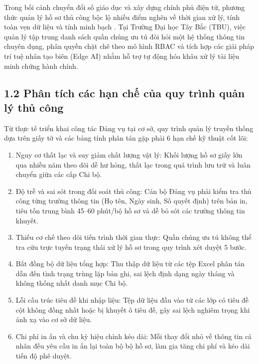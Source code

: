 \documentclass[12pt,a4paper]{report}
\begin{document}
Trong bối cảnh chuyển đổi số giáo dục và xây dựng chính phủ điện tử, phương thức quản lý hồ sơ thủ công bộc lộ nhiều điểm nghẽn về thời gian xử lý, tính toàn vẹn dữ liệu và tính minh bạch \cite{nusa2020iop, nofrianda2022jictas}. Tại Trường Đại học Tây Bắc (TBU), việc quản lý tập trung danh sách quần chúng ưu tú đòi hỏi một hệ thống thông tin chuyên dụng, phân quyền chặt chẽ theo mô hình RBAC và tích hợp các giải pháp trí tuệ nhân tạo biên (Edge AI) nhằm hỗ trợ tự động hóa khâu xử lý tài liệu minh chứng hành chính.

\subsection*{1.2 Phân tích các hạn chế của quy trình quản lý thủ công}
Từ thực tế triển khai công tác Đảng vụ tại cơ sở, quy trình quản lý truyền thống dựa trên giấy tờ và các bảng tính phân tán gặp phải 6 hạn chế kỹ thuật cốt lõi:
\begin{enumerate}[label=\arabic*.]
  \item Nguy cơ thất lạc và suy giảm chất lượng vật lý: Khối lượng hồ sơ giấy lớn qua nhiều năm theo dõi dễ hư hỏng, thất lạc trong quá trình lưu trữ và luân chuyển giữa các cấp Chi bộ.
  \item Độ trễ và sai sót trong đối soát thủ công: Cán bộ Đảng vụ phải kiểm tra thủ công từng trường thông tin (Họ tên, Ngày sinh, Số quyết định) trên bản in, tiêu tốn trung bình 45--60 phút/bộ hồ sơ và dễ bỏ sót các trường thông tin khuyết.
  \item Thiếu cơ chế theo dõi tiến trình thời gian thực: Quần chúng ưu tú không thể tra cứu trực tuyến trạng thái xử lý hồ sơ trong quy trình xét duyệt 5 bước.
  \item Bất đồng bộ dữ liệu tổng hợp: Thu thập dữ liệu từ các tệp Excel phân tán dẫn đến tình trạng trùng lặp bản ghi, sai lệch định dạng ngày tháng và không thống nhất danh mục Chi bộ.
  \item Lỗi cấu trúc tiêu đề khi nhập liệu: Tệp dữ liệu đầu vào từ các lớp có tiêu đề cột không đồng nhất hoặc bị khuyết ô tiêu đề, gây sai lệch nghiêm trọng khi ánh xạ vào cơ sở dữ liệu.
  \item Chi phí in ấn và chu kỳ hiệu chỉnh kéo dài: Mỗi thay đổi nhỏ về thông tin cá nhân đều yêu cầu in ấn lại toàn bộ bộ hồ sơ, làm gia tăng chi phí và kéo dài tiến độ phê duyệt.
\end{enumerate}
\end{document}
